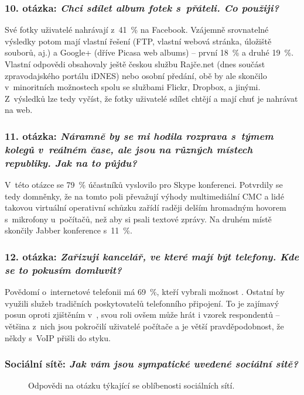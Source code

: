 \documentclass[12pt,oneside,final]{fithesis2}
\begin{document}
\subsubsection*{\textbf{10. otázka:} \emph{Chci sdílet album fotek s~přáteli. Co použiji?}}
Své fotky uživatelé nahrávají z~41~\% na Facebook. Vzájemně srovnatelné výsledky potom mají vlastní řešení (FTP, vlastní webová stránka, úložiště souborů, aj.) a Google+ (dříve Picasa web albums) -- první 18~\% a druhé 19~\%. Vlastní odpovědi obsahovaly ještě českou službu Rajče.net (dnes součást zpravodajského portálu iDNES) nebo osobní předání, obě by ale skončilo v~minoritních možnostech spolu se službami Flickr, Dropbox, a jinými. Z~výsledků lze tedy vyčíst, že fotky uživatelé sdílet chtějí a mají chuť je nahrávat na web.

\subsubsection*{\textbf{11. otázka:} \emph{Náramně by se mi hodila rozprava s~týmem kolegů v~reálném čase, ale jsou na různých místech republiky. Jak na to půjdu?}}
V~této otázce se 79~\% účastníků vyslovilo pro Skype konferenci. Potvrdily se tedy domněnky, že na tomto poli převažují výhody multimediální CMC a lidé takovou virtuální operativní schůzku zařídí raději delším hromadným hovorem s~mikrofony u~počítačů, než aby si psali textové zprávy. Na druhém místě skončily Jabber konference s~11~\%.

\subsubsection*{\textbf{12. otázka:} \emph{Zařizuji kancelář, ve které mají být telefony. Kde se to pokusím domluvit?}}
Povědomí o~internetové telefonii má 69~\%, kteří vybrali možnost . Ostatní by využili služeb tradičních poskytovatelů telefonního připojení. To je zajímavý posun oproti zjištěním v~\cite{latif2007adoption}, svou roli ovšem může hrát i vzorek respondentů -- většina z~nich jsou pokročilí uživatelé počítače a je větší pravděpodobnost, že někdy s~VoIP přišli do styku.

\subsubsection*{\textbf{Sociální sítě:} \emph{Jak vám jsou sympatické uvedené sociální sitě?}}
\begin{figure}[H]
    \centering


    \caption{Odpovědi na otázku týkající se oblíbenosti sociálních sítí.}
\end{figure}
\end{document}

